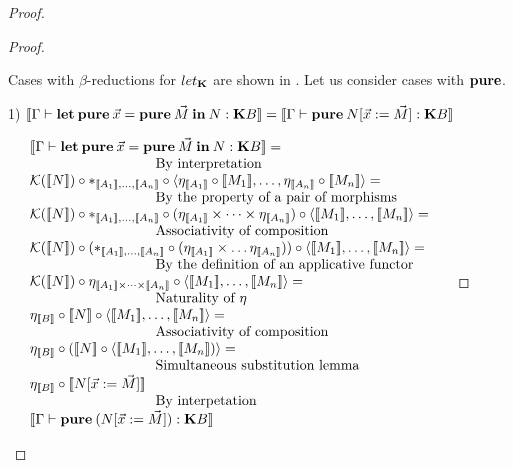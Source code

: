 \documentclass[a4paper]{article}
\begin{document}
\begin{proof}
\begin{proof}
  $ $

Cases with $\beta$-reductions for $let_{\bf K}$ are shown in \cite{ModalK1}. Let us consider cases with ${\bf pure}$.

\vspace{\baselineskip}

1) $[\![\Gamma \vdash {\bf let \: pure \:} \vec{x} = {\bf pure \:} \vec{M} {\: \bf in \:} N : {\bf K}B]\!] = [\![\Gamma \vdash {\bf pure \:} N [\vec{x} := \vec{M}] : {\bf K}B]\!]$

\vspace{\baselineskip}

$\begin{array}{lll}
&[\![\Gamma \vdash {\bf let \: pure \:} \vec{x} = {\bf pure \:} \vec{M} {\: \bf in \:} N : {\bf K}B]\!] = & \\
&\text{\quad\quad\quad\quad\quad\quad\quad\quad\quad By interpretation}& \\
&\mathcal{K}([\![N]\!]) \circ \ast_{[\![A_1]\!],\dots,[\![A_n]\!]} \circ \langle \eta_{[\![A_1]\!]} \circ [\![M_1]\!],\dots,\eta_{[\![A_n]\!]} \circ [\![M_n]\!] \rangle = \\
&\text{\quad\quad\quad\quad\quad\quad\quad\quad\quad By the property of a pair of morphisms}& \\
&\mathcal{K}([\![N]\!]) \circ \ast_{[\![A_1]\!],\dots,[\![A_n]\!]} \circ (\eta_{[\![A_1]\!]} \times \dots \times \eta_{[\![A_n]\!]}) \circ \langle [\![M_1]\!], \dots, [\![M_n]\!]\rangle =& \\
&\text{\quad\quad\quad\quad\quad\quad\quad\quad\quad Associativity of composition}& \\
&\mathcal{K}([\![N]\!]) \circ (\ast_{[\![A_1]\!],\dots,[\![A_n]\!]} \circ (\eta_{[\![A_1]\!]} \times \dots \eta_{[\![A_n]\!]})) \circ \langle [\![M_1]\!], \dots, [\![M_n]\!] \rangle =& \\
&\text{\quad\quad\quad\quad\quad\quad\quad\quad\quad By the definition of an applicative functor}& \\
&\mathcal{K}([\![N]\!]) \circ \eta_{[\![A_1]\!] \times \dots \times [\![A_n]\!]} \circ \langle [\![M_1]\!], \dots, [\![M_n]\!] \rangle =& \\
&\text{\quad\quad\quad\quad\quad\quad\quad\quad\quad Naturality of $\eta$}& \\
&\eta_{[\![B]\!]} \circ [\![N]\!] \circ \langle [\![M_1]\!], \dots, [\![M_n]\!] \rangle =& \\
&\text{\quad\quad\quad\quad\quad\quad\quad\quad\quad Associativity of composition}& \\
&\eta_{[\![B]\!]} \circ ([\![N]\!] \circ \langle [\![M_1]\!], \dots, [\![M_n]\!]) \rangle =& \\
&\text{\quad\quad\quad\quad\quad\quad\quad\quad\quad Simultaneous substitution lemma}& \\
&\eta_{[\![B]\!]} \circ [\![N [\vec{x} := \vec{M}]]\!]& \\
&\text{\quad\quad\quad\quad\quad\quad\quad\quad\quad By interpetation}& \\
&[\![\Gamma \vdash {\bf pure \:} (N [\vec{x} := \vec{M}]) : {\bf K}B]\!]&
\end{array}$


\end{proof}
\end{proof}
\end{document}
